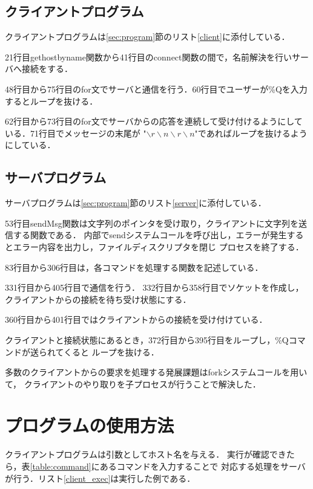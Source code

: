 \documentclass[11pt]{jarticle}
\begin{document}
\subsection{クライアントプログラム}

クライアントプログラムは\ref{sec:program}節のリスト\ref{client}に添付している．

21行目gethostbyname関数から41行目のconnect関数の間で，名前解決を行いサーバへ接続をする．

48行目から75行目のfor文でサーバと通信を行う．60行目でユーザーが\%Qを入力するとループを抜ける．

62行目から73行目のfor文でサーバからの応答を連続して受け付けるようにしている．71行目でメッセージの末尾が
"$\backslash r\backslash n\backslash r\backslash n$"であればループを抜けるようにしている．

\subsection{サーバプログラム}

サーバプログラムは\ref{sec:program}節のリスト\ref{server}に添付している．

53行目sendMsg関数は文字列のポインタを受け取り，クライアントに文字列を送信する関数である．
内部でsendシステムコールを呼び出し，エラーが発生するとエラー内容を出力し，ファイルディスクリプタを閉じ
プロセスを終了する．

83行目から306行目は，各コマンドを処理する関数を記述している．

331行目から405行目で通信を行う．
332行目から358行目でソケットを作成し，クライアントからの接続を待ち受け状態にする．

360行目から401行目ではクライアントからの接続を受け付けている．

クライアントと接続状態にあるとき，372行目から395行目をループし，\%Qコマンドが送られてくると
ループを抜ける．

多数のクライアントからの要求を処理する発展課題はforkシステムコールを用いて，
クライアントのやり取りを子プロセスが行うことで解決した．

\section{プログラムの使用方法}

クライアントプログラムは引数としてホスト名を与える．
実行が確認できたら，表\ref{table:command}にあるコマンドを入力することで
対応する処理をサーバが行う．リスト\ref{client_exec}は実行した例である．
\end{document}
